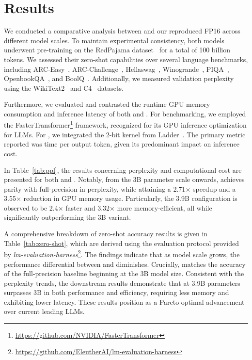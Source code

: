 \section{Results}

We conducted a comparative analysis between  and our reproduced FP16  across different model scales. To maintain experimental consistency, both models underwent pre-training on the RedPajama dataset~\cite{redpajama} for a total of 100 billion tokens. We assessed their zero-shot capabilities over several language benchmarks, including ARC-Easy~\cite{arc}, ARC-Challenge~\cite{arc}, Hellaswag~\cite{hellaswag}, Winogrande~\cite{winoGrande}, PIQA~\cite{piqa}, OpenbookQA~\cite{openbookqa}, and BoolQ~\cite{boolq}. Additionally, we measured validation perplexity using the WikiText2~\cite{wikitext2} and C4~\cite{c4} datasets.

Furthermore, we evaluated and contrasted the runtime GPU memory consumption and inference latency of both  and . For benchmarking, we employed the FasterTransformer\footnote{\url{https://github.com/NVIDIA/FasterTransformer}} framework, recognized for its GPU inference optimization for LLMs. For , we integrated the 2-bit kernel from Ladder~\cite{ladder}. The primary metric reported was time per output token, given its predominant impact on inference cost.

In Table~\ref{tab:ppl}, the results concerning perplexity and computational cost are presented for both  and . Notably, from the 3B parameter scale onwards,  achieves parity with full-precision  in perplexity, while attaining a 2.71$\times$ speedup and a 3.55$\times$ reduction in GPU memory usage. Particularly, the 3.9B  configuration is observed to be 2.4$\times$ faster and 3.32$\times$ more memory-efficient, all while significantly outperforming the 3B  variant.

A comprehensive breakdown of zero-shot accuracy results is given in Table~\ref{tab:zero-shot}, which are derived using the evaluation protocol provided by \emph{lm-evaluation-harness}\footnote{\url{https://github.com/EleutherAI/lm-evaluation-harness}}. The findings indicate that as model scale grows, the performance differential between  and  diminishes. Crucially,  matches the accuracy of the full-precision baseline beginning at the 3B model size. Consistent with the perplexity trends, the downstream results demonstrate that  at 3.9B parameters surpasses  3B in both performance and efficiency, requiring less memory and exhibiting lower latency. These results position  as a Pareto-optimal advancement over current leading LLMs.

